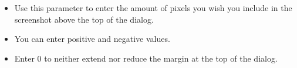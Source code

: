 \begin{itemize}
\item Use this parameter to enter the amount of pixels you wish you include in the screenshot above the top of the dialog. 
\item You can enter positive and negative values. 
\item Enter 0 to neither extend nor reduce the margin at the top of the dialog.  
\end{itemize}
